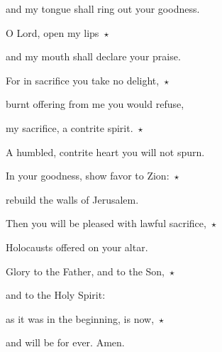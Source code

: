 and my tongue shall ring out your goodness. 

\noindent O Lord, open my lips~$\star$~\nopagebreak

and my mouth shall declare your praise.

\noindent For in sacrifice you take no delight,~$\star$~\nopagebreak

burnt offering from me you would refuse,

\noindent my sacrifice, a contrite spirit.~$\star$~\nopagebreak

A humbled, contrite heart you will not spurn.

\noindent In your goodness, show favor to Zion:~$\star$~\nopagebreak

rebuild the walls of Jerusalem.

\noindent Then you will be pleased with lawful sacrifice,~$\star$~\nopagebreak

Holocausts offered on your altar.

\noindent Glory to the Father, and to the Son,~$\star$~\nopagebreak

and to the Holy Spirit:

\noindent as it was in the beginning, is now,~$\star$~\nopagebreak

and will be for ever. Amen.